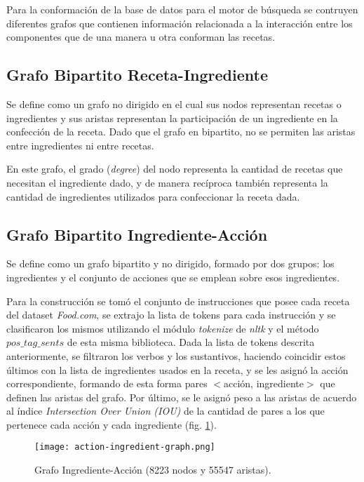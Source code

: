 \documentclass[
	a4paper, %
	10pt, %
	unnumberedsections, %
	twoside, %
]{LTJournalArticle}
\begin{document}
Para la conformación de la base de datos para el motor de búsqueda se contruyen diferentes grafos que
contienen información relacionada a la interacción entre los componentes que de una manera u otra conforman
las recetas.

\subsection{Grafo Bipartito Receta-Ingrediente}

Se define como un grafo no dirigido en el cual sus nodos representan
recetas o ingredientes y sus aristas representan la participación de un ingrediente en la confección de la receta.
Dado que el grafo en bipartito, no se permiten las aristas entre ingredientes ni entre recetas.

En este grafo, el grado (\textit{degree}) del nodo representa la cantidad de recetas que necesitan
el ingrediente dado, y de manera recíproca también representa la cantidad de ingredientes utilizados para 
confeccionar la receta dada.

\subsection{Grafo Bipartito Ingrediente-Acción}

Se define como un grafo bipartito y no dirigido, formado por dos grupos: los ingredientes y el conjunto de 
acciones que se emplean sobre esos ingredientes. 

Para la construcción se tomó el conjunto de instrucciones que posee cada receta del dataset \textit{Food.com},
se extrajo la lista de tokens para cada instrucción y se clasificaron los mismos utilizando el módulo 
\emph{tokenize} de \textit{nltk} y el método \emph{$pos\_tag\_sents$} de esta misma biblioteca. Dada la 
lista de tokens descrita anteriormente, se filtraron los verbos y los sustantivos, haciendo coincidir estos 
últimos con la lista de ingredientes usados en la receta, y se les asignó la acción correspondiente, formando 
de esta forma pares $<$acción, ingrediente$>$ que definen las aristas del grafo. Por último, se le asignó peso 
a las aristas de acuerdo al índice \textit{Intersection Over Union (IOU)} de la cantidad de pares a los que 
pertenece cada acción y cada ingrediente (fig. \ref{fig:ingredient-action-graph}). 

\begin{figure}
	\texttt{[image: action-ingredient-graph.png]}
	\caption{Grafo Ingrediente-Acción (8223 nodos y 55547 aristas).}
	\label{fig:ingredient-action-graph}
\end{figure}
\end{document}

